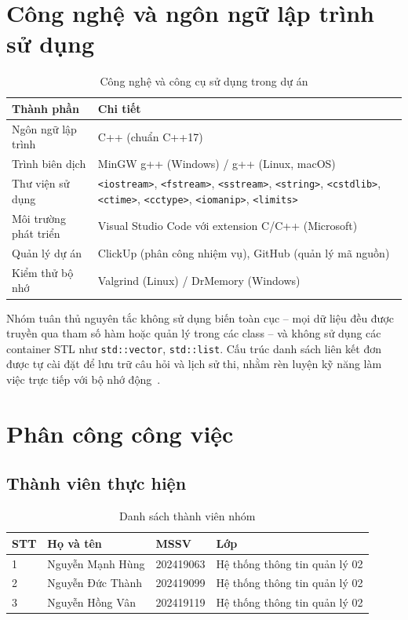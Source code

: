 \documentclass[11pt]{report}
\begin{document}
\section{Công nghệ và ngôn ngữ lập trình sử dụng}

\begin{table}[H]
    \centering
    \begin{tabularx}{\textwidth}{|l|>{\raggedright\arraybackslash}X|} \hline
        \textbf{Thành phần} & \textbf{Chi tiết} \\ \hline
        Ngôn ngữ lập trình & C++ (chuẩn C++17) \\ \hline
        Trình biên dịch & MinGW g++ (Windows) / g++ (Linux, macOS) \\ \hline
        Thư viện sử dụng & \texttt{<iostream>}, \texttt{<fstream>}, \texttt{<sstream>}, \texttt{<string>}, \texttt{<cstdlib>}, \texttt{<ctime>}, \texttt{<cctype>}, \texttt{<iomanip>}, \texttt{<limits>} \\ \hline
        Môi trường phát triển & Visual Studio Code với extension C/C++ (Microsoft) \\ \hline
        Quản lý dự án & ClickUp (phân công nhiệm vụ), GitHub (quản lý mã nguồn) \\ \hline
        Kiểm thử bộ nhớ & Valgrind (Linux) / DrMemory (Windows) \\ \hline
    \end{tabularx}
    \caption{Công nghệ và công cụ sử dụng trong dự án}
    \label{tab:congnghe}
\end{table}

Nhóm tuân thủ nguyên tắc không sử dụng biến toàn cục -- mọi dữ liệu đều được truyền qua tham số hàm hoặc quản lý trong các class -- và không sử dụng các container STL như \texttt{std::vector}, \texttt{std::list}. Cấu trúc danh sách liên kết đơn được tự cài đặt để lưu trữ câu hỏi và lịch sử thi, nhằm rèn luyện kỹ năng làm việc trực tiếp với bộ nhớ động~\cite{stroustrup2013}.

\section{Phân công công việc}

\subsection{Thành viên thực hiện}

\begin{table}[H]
    \centering
    \begin{tabularx}{\textwidth}{|l|l|l|X|} \hline
        \textbf{STT} & \textbf{Họ và tên} & \textbf{MSSV} & \textbf{Lớp} \\ \hline
        1 & Nguyễn Mạnh Hùng  & 202419063 & Hệ thống thông tin quản lý 02 \\ \hline
        2 & Nguyễn Đức Thành  & 202419099 & Hệ thống thông tin quản lý 02 \\ \hline
        3 & Nguyễn Hồng Vân   & 202419119 & Hệ thống thông tin quản lý 02 \\ \hline
    \end{tabularx}
    \caption{Danh sách thành viên nhóm}
    \label{tab:thanhvien}
\end{table}
\end{document}
